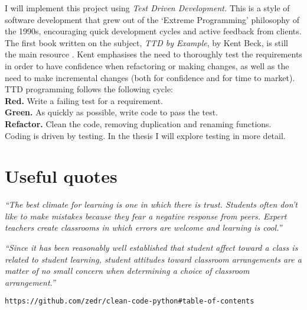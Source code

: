 \documentclass[10pt]{article}
\begin{document}
I will implement this project using \emph{Test Driven Development.} This is a style of software development that grew out of the `Extreme Programming' philosophy of the 1990s, encouraging quick development cycles and active feedback from clients. The first book written on the subject, \emph{TTD by Example}, by Kent Beck, is still the main resource \cite{Beck03}. Kent emphasises the need to thoroughly test the requirements in order to have confidence when refactoring or making changes, as well as the need to make incremental changes (both for confidence and for time to market). TTD programming follows the following cycle: \\
\indent \textbf{Red.} Write a failing test for a requirement. \\
\indent \textbf{Green.} As quickly as possible, write code to pass the test. \\
\indent \textbf{Refactor.} Clean the code, removing duplication and renaming functions. \\
Coding is driven by testing. In the thesis I will explore testing in more detail.


\section{Useful quotes}
 
\begin{center} 
\emph{``The best climate for learning is one in which there is trust. Students often don’t like to make mistakes because they fear a negative response from peers. Expert teachers create classrooms in which errors are welcome and learning is cool.''} \cite{Hat12}
\end{center}
 
\begin{center} 
\emph{``Since it has been reasonably well established that student affect toward a class is related to student learning, student attitudes toward classroom arrangements are a matter of no small concern when determining a choice of classroom arrangement.''} \cite{MM78}
\end{center}

\begin{verbatim}
https://github.com/zedr/clean-code-python#table-of-contents
\end{verbatim}
\end{document}
